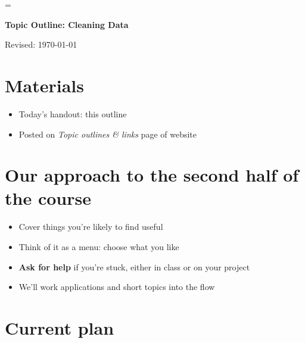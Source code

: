 \documentclass[11pt]{article}
\begin{document}
\parskip=\bigskipamount
\parindent=0.0in
\thispagestyle{empty}


\bigskip\bigskip
\centerline{\Large \bf Topic Outline:  Cleaning Data}
\centerline{Revised: \today}

\section*{Materials}

\begin{itemize}
\item  Today's handout:  this outline
\item  Posted on {\it Topic outlines \& links\/} page of website
\end{itemize}


\section*{Our approach to the second half of the course}

\begin{itemize}
\item Cover things you're likely to find useful
\item Think of it as a menu:  choose what you like
\item {\bf Ask for help} if you're stuck, either in class or on your project
\item We'll work applications and short topics into the flow
\end{itemize}


\section*{Current plan}
\end{document}
